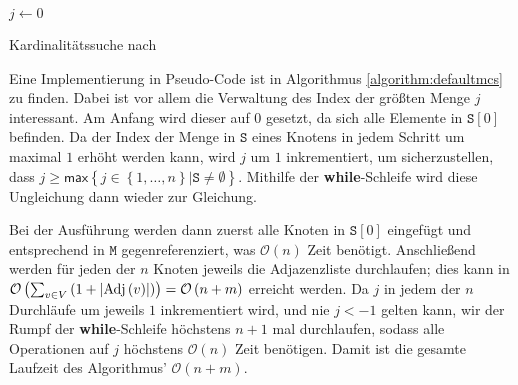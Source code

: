 \begin{algorithm}
	\SetAlgoVlined
	\( j \longleftarrow 0 \)\;
	\caption{Kardinalitätssuche nach \cite[2.1]{sankardeep}}
	\label{algorithm:defaultmcs}
\end{algorithm}

Eine Implementierung in Pseudo-Code ist in Algorithmus \ref{algorithm:defaultmcs} zu finden. Dabei ist vor allem die Verwaltung des Index der größten Menge \( j \) interessant. Am Anfang wird dieser auf \( 0 \) gesetzt, da sich alle Elemente in \( \texttt{S} \left[ 0 \right] \) befinden. Da der Index der Menge in \( \texttt{S} \) eines Knotens in jedem Schritt um maximal \( 1 \) erhöht werden kann, wird  \( j \) um \( 1 \) inkrementiert, um sicherzustellen, dass \( j \geq \textsf{max} \left\lbrace j \in \left\lbrace 1, \ldots, n \right\rbrace | \texttt{S} \neq \emptyset \right\rbrace \). Mithilfe der \textbf{while}-Schleife wird diese Ungleichung dann wieder zur Gleichung.

Bei der Ausführung werden dann zuerst alle Knoten in \( \texttt{S} \left[ 0 \right] \) eingefügt und entsprechend in \( \texttt{M} \) gegenreferenziert, was \( \mathcal{O} \left( n \right) \) Zeit benötigt. Anschließend werden für jeden der \( n \) Knoten jeweils die Adjazenzliste durchlaufen; dies kann in \(\mathcal{O}\left( \sum_{v \in V} \left(1 + \left| \textnormal{Adj} \left( v \right) \right| \right) \right) = \mathcal{O} \left( n + m \right) \) erreicht werden. Da \( j \) in jedem der \( n \) Durchläufe um jeweils \( 1 \) inkrementiert wird, und nie \( j < -1 \) gelten kann, wir der Rumpf der \textbf{while}-Schleife höchstens \( n + 1\) mal durchlaufen, sodass alle Operationen auf \( j \) höchstens \( \mathcal{O} \left( n \right) \) Zeit benötigen. Damit ist die gesamte Laufzeit des Algorithmus' \( \mathcal{O} \left( n + m \right) \).

